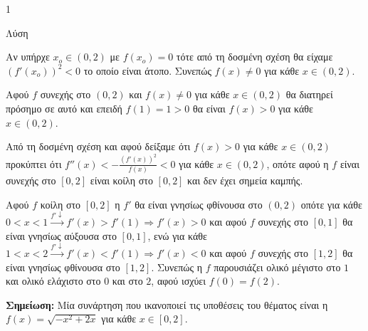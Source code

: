 \begin{ylh}{1}
    \item [Ύλη από εικόνα] Λύση
\end{ylh}
\begin{alist}
    \item[α)]
    \begin{rlist}
        \item [i.] Αν υπήρχε $x_o \in (0,2)$ με $f(x_o)=0$ τότε από τη δοσμένη σχέση θα είχαμε $(f'(x_o))^2 < 0$ το οποίο είναι άτοπο. Συνεπώς $f(x) \neq 0$ για κάθε $x \in (0,2)$.
        \item [ii.] Αφού $f$ συνεχής στο $(0,2)$ και $f(x) \neq 0$ για κάθε $x \in (0,2)$ θα διατηρεί πρόσημο σε αυτό και επειδή $f(1)=1>0$ θα είναι $f(x)>0$ για κάθε $x \in (0,2)$.
    \end{rlist}
    \item[β)] Από τη δοσμένη σχέση και αφού δείξαμε ότι $f(x)>0$ για κάθε $x \in (0,2)$ προκύπτει ότι $f''(x) < -\frac{(f'(x))^2}{f(x)} < 0$ για κάθε $x \in (0,2)$, οπότε αφού η $f$ είναι συνεχής στο $[0,2]$ είναι κοίλη στο $[0,2]$ και δεν έχει σημεία καμπής.
    \item[γ)] Αφού $f$ κοίλη στο $[0,2]$ η $f'$ θα είναι γνησίως φθίνουσα στο $(0,2)$ οπότε για κάθε $0 < x < 1 \xrightarrow{f'\downarrow} f'(x) > f'(1) \Rightarrow f'(x) > 0$ και αφού $f$ συνεχής στο $[0,1]$ θα είναι γνησίως αύξουσα στο $[0,1]$, ενώ για κάθε $1 < x < 2 \xrightarrow{f'\downarrow} f'(x) < f'(1) \Rightarrow f'(x) < 0$ και αφού $f$ συνεχής στο $[1,2]$ θα είναι γνησίως φθίνουσα στο $[1,2]$.
    Συνεπώς η $f$ παρουσιάζει ολικό μέγιστο στο $1$ και ολικό ελάχιστο στο $0$ και στο $2$, αφού ισχύει $f(0)=f(2)$.
\end{alist}

\noindent
\textbf{Σημείωση:} Μία συνάρτηση που ικανοποιεί τις υποθέσεις του θέματος είναι η $f(x) = \sqrt{-x^2+2x}$ για κάθε $x \in [0,2]$.